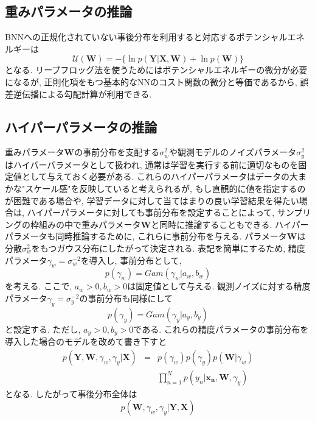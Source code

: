 \documentclass[twocolumn]{jarticle}
\begin{document}
\subsection{重みパラメータの推論}
BNNへの正規化されていない事後分布を利用すると対応するポテンシャルエネルギーは
\begin{equation}
  \mathcal{U}(\bm {W}) = - \{\ln p(\bm {Y|X, W}) + \ln p (\bm {W})\}
\end{equation}
となる. リープフロッグ法を使うためにはポテンシャルエネルギーの微分が必要になるが, 正則化項をもつ基本的なNNのコスト関数の微分と等価であるから, 誤差逆伝播による勾配計算が利用できる.

\subsection{ハイパーパラメータの推論}
重みパラメータ${\bm {W}}$の事前分布を支配する${\sigma_w^2}$や観測モデルのノイズパラメータ${\sigma_y^2}$はハイパーパラメータとして扱われ, 通常は学習を実行する前に適切なものを固定値として与えておく必要がある. これらのハイパーパラメータはデータの大まかな"スケール感"を反映していると考えられるが, もし直観的に値を指定するのが困難である場合や, 学習データに対して当てはまりの良い学習結果を得たい場合は, ハイパーパラメータに対しても事前分布を設定することによって, サンプリングの枠組みの中で重みパラメータ${\bm {W}}$と同時に推論することもできる.
ハイパーパラメータも同時推論するために, これらに事前分布を与える. パラメータ${\bm {W}}$は分散${\sigma_w^2}$をもつガウス分布にしたがって決定される. 表記を簡単にするため, 精度パラメータ${\gamma_w = \sigma_w^{-2}}$を導入し, 事前分布として,
\begin{equation}
  p(\gamma_w) = Gam (\gamma_w | a_w, b_w)
\end{equation}
を考える. ここで, ${a_w > 0, b_w > 0}$は固定値として与える. 観測ノイズに対する精度パラメータ${\gamma_y = \sigma_y^{-2}}$の事前分布も同様にして
\begin{equation}
  p(\gamma _y) = Gam (\gamma_y|a_y, b_y)
\end{equation}
と設定する. ただし, ${a_y > 0, b_y > 0}$である.
これらの精度パラメータの事前分布を導入した場合のモデルを改めて書き下すと
\begin{eqnarray}
  p(\bm {Y, W}, \gamma_w, \gamma_y | \bm {X}) &=& p(\gamma_w)p(\gamma_y)p(\bm {W} | \gamma_w) \nonumber \\
  && \prod _{n = 1}^{N} p(y_n|\bm {x_n, W}, \gamma_y)
\end{eqnarray}
となる. したがって事後分布全体は
\begin{equation}
  p(\bm {W}, \gamma_w, \gamma_y | \bm {Y, X})
\end{equation}
\end{document}
